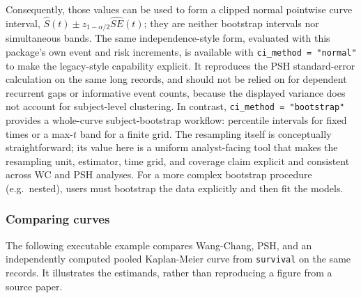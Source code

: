 \documentclass[
  12pt]{article}
\begin{document}
Consequently, those values can be used to form a clipped normal
pointwise curve interval,
\(\widehat S(t)\mathbin{\pm}z_{1-\alpha/2}\widehat{SE}(t)\); they are
neither bootstrap intervals nor simultaneous bands. The same
independence-style form, evaluated with this package's own event and
risk increments, is available with \texttt{ci\_method\ =\ "normal"} to
make the legacy-style capability explicit. It reproduces the PSH
standard-error calculation on the same long records, and should not be
relied on for dependent recurrent gaps or informative event counts,
because the displayed variance does not account for subject-level
clustering. In contrast, \texttt{ci\_method\ =\ "bootstrap"} provides a
whole-curve subject-bootstrap workflow: percentile intervals for fixed
times or a max-\(t\) band for a finite grid. The resampling itself is
conceptually straightforward; its value here is a uniform analyst-facing
tool that makes the resampling unit, estimator, time grid, and coverage
claim explicit and consistent across WC and PSH analyses. For a more
complex bootstrap procedure (e.g.~nested), users must bootstrap the data
explicitly and then fit the models.

\subsubsection{Comparing curves}\label{comparing-curves}

The following executable example compares Wang-Chang, PSH, and an
independently computed pooled Kaplan-Meier curve from \texttt{survival}
\citep{survival} on the same records. It illustrates the estimands,
rather than reproducing a figure from a source paper.
\end{document}
